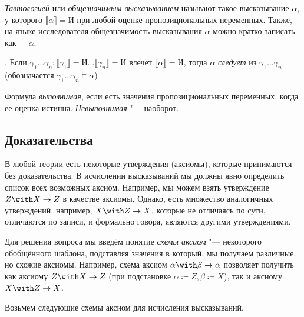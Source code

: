\begin{definition}[тавтология] \emph{Тавтологией} или \emph{общезначимым высказыванием}
  называют такое высказывание $\alpha$, у которого $\llbracket \alpha \rrbracket
  = \texttt{И}$ при любой оценке пропозициональных переменных. Также, на языке исследователя общезначимость высказывания $\alpha$ можно кратко записать как $\models \alpha$. 
\end{definition}

\begin{definition}[следование].
Если $\gamma_1 \dots \gamma_n : \llbracket \gamma_1 \rrbracket = \texttt{И} \dots
\llbracket \gamma_n \rrbracket = \texttt{И}$ влечет $\llbracket \alpha
\rrbracket = \texttt{И}$,  тогда $\alpha$ \emph{следует} из $\gamma_1 \dots
\gamma_n$ (обозначается $\gamma_1 \dots \gamma_n \models \alpha$) 
\end{definition}

\begin{definition}[выполнимость] Формула \emph{выполнимая}, если есть значения
  пропозициональных переменных, когда ее оценка истинна. \emph{Невыполнимая}
  "--- наоборот.
\end{definition}


\subsection{Доказательства}

В любой теории есть некоторые утверждения (аксиомы), которые принимаются без доказательства.
В исчислении высказываний мы должны явно определить список всех возможных аксиом. 
Например, мы можем взять утверждение $Z \with X \rightarrow Z$ в качестве аксиомы.
Однако, есть множество аналогичных утверждений, например, $X \with Z \rightarrow X$,
которые не отличаясь по сути, отличаются по записи, и формально говоря, являются другими
утверждениями.

Для решения вопроса мы введём понятие \emph{схемы аксиом} "--- некоторого обобщённого
шаблона, подставляя значения в который, мы получаем различные, но схожие аксиомы. 
Например, схема аксиом $\alpha \with \beta \rightarrow \alpha$ позволяет получить как
аксиому $Z \with X \rightarrow Z$ (при подстановке $\alpha \coloneqq  Z, \beta
\coloneqq  X$), так и аксиому $X \with Z \rightarrow X$.

Возьмем следующие схемы аксиом для исчисления высказываний.

